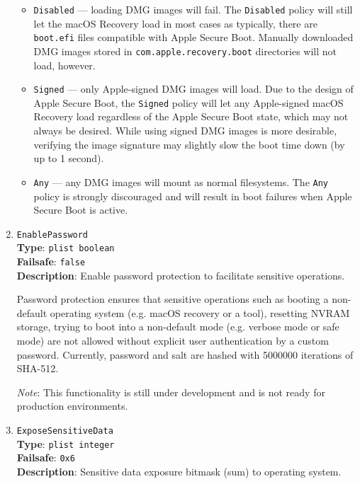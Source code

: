 \documentclass[]{article}
\providecommand{\tightlist}{%
  \setlength{\itemsep}{0pt}\setlength{\parskip}{0pt}}
\begin{document}
\begin{enumerate}
  \begin{itemize}
  \tightlist
  \item \texttt{Disabled} --- loading DMG images will fail. The \texttt{Disabled}
    policy will still let the macOS Recovery load in most cases as typically,
    there are \texttt{boot.efi} files compatible with Apple Secure Boot.
    Manually downloaded DMG images stored in \texttt{com.apple.recovery.boot}
    directories will not load, however.
  \item \texttt{Signed} --- only Apple-signed DMG images will load. Due to
    the design of Apple Secure Boot, the \texttt{Signed} policy will let any
    Apple-signed macOS Recovery load regardless of the Apple Secure Boot state,
    which may not always be desired. While using signed DMG images is more desirable,
    verifying the image signature may slightly slow the boot time down (by up to 1 second).
  \item \texttt{Any} --- any DMG images will mount as normal filesystems.
    The \texttt{Any} policy is strongly discouraged and will result in boot
    failures when Apple Secure Boot is active.
  \end{itemize}

\item
  \texttt{EnablePassword}\\
  \textbf{Type}: \texttt{plist\ boolean}\\
  \textbf{Failsafe}: \texttt{false}\\
  \textbf{Description}: Enable password protection to facilitate sensitive operations.

  Password protection ensures that sensitive operations such as booting a non-default
  operating system (e.g. macOS recovery or a tool), resetting NVRAM storage,
  trying to boot into a non-default mode (e.g. verbose mode or safe mode) are not
  allowed without explicit user authentication by a custom password. Currently,
  password and salt are hashed with 5000000 iterations of SHA-512.

  \emph{Note}: This functionality is still under development and is not ready for
  production environments.

\item
  \texttt{ExposeSensitiveData}\\
  \textbf{Type}: \texttt{plist\ integer}\\
  \textbf{Failsafe}: \texttt{0x6}\\
  \textbf{Description}: Sensitive data exposure bitmask (sum) to operating system.


\end{enumerate}
\end{document}
